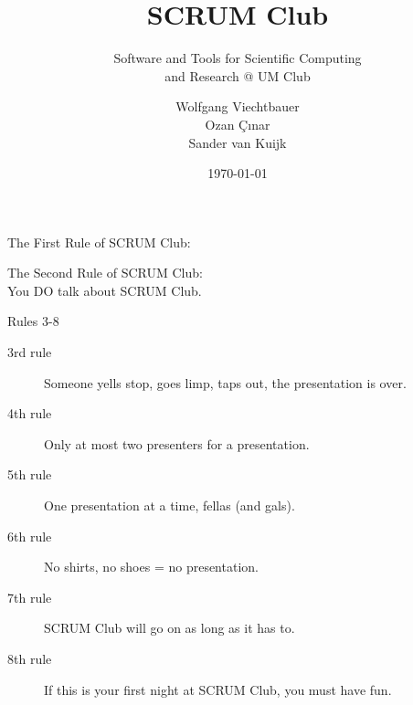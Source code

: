 \documentclass[t,12pt]{beamer}
\title{SCRUM Club}
\subtitle{Software and Tools for Scientific Computing\\ and Research @ UM Club}
\date{\today}
\author{Wolfgang Viechtbauer\\Ozan \c{C}{\i}nar\\Sander van Kuijk}
\institute{Maastricht University}
\begin{document}
\maketitle


\begin{frame}[standout]

   The First Rule of SCRUM Club:\\
   \vspace{1ex}

\end{frame}


\begin{frame}[standout]

   The Second Rule of SCRUM Club:\\
   \vspace{1ex}
   You DO talk about SCRUM Club.

\end{frame}


\begin{frame}{Rules 3-8}

\begin{description}
\item[3rd rule] Someone yells stop, goes limp, taps out, the presentation is over.
\item[4th rule] Only at most two presenters for a presentation.
\item[5th rule] One presentation at a time, fellas (and gals).
\item[6th rule] No shirts, no shoes = no presentation.
\item[7th rule] SCRUM Club will go on as long as it has to.
\item[8th rule] If this is your first night at SCRUM Club, you must have fun.
\end{description}

\end{frame}

\end{document}
